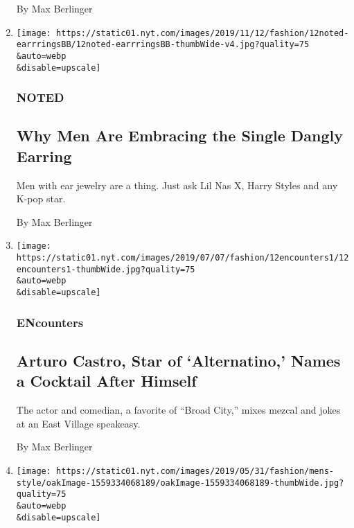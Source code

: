 \begin{enumerate}
  By Max Berlinger
\item
  \href{/2019/11/12/fashion/mens-single-dangly-earring.html}{}

  \texttt{[image: https://static01.nyt.com/images/2019/11/12/fashion/12noted-earrringsBB/12noted-earrringsBB-thumbWide-v4.jpg?quality=75\\\&auto=webp\\\&disable=upscale]}

  \hypertarget{noted}{%
  \subsubsection{NOTED}\label{noted}}

  \hypertarget{why-men-are-embracing-the-single-dangly-earring}{%
  \subsection{Why Men Are Embracing the Single Dangly
  Earring}\label{why-men-are-embracing-the-single-dangly-earring}}

  Men with ear jewelry are a thing. Just ask Lil Nas X, Harry Styles and
  any K-pop star.

  By Max Berlinger
\item
  \href{/2019/07/05/style/arturo-castro-alternatino-broad-city.html}{}

  \texttt{[image: https://static01.nyt.com/images/2019/07/07/fashion/12encounters1/12encounters1-thumbWide.jpg?quality=75\\\&auto=webp\\\&disable=upscale]}

  \hypertarget{encounters-1}{%
  \subsubsection{ENcounters}\label{encounters-1}}

  \hypertarget{arturo-castro-star-of-alternatino-names-a-cocktail-after-himself}{%
  \subsection{Arturo Castro, Star of `Alternatino,' Names a Cocktail
  After
  Himself}\label{arturo-castro-star-of-alternatino-names-a-cocktail-after-himself}}

  The actor and comedian, a favorite of ``Broad City,'' mixes mezcal and
  jokes at an East Village speakeasy.

  By Max Berlinger
\item
  \href{/2019/06/05/fashion/mens-style/new-mens-underwear-briefly.html}{}

  \texttt{[image: https://static01.nyt.com/images/2019/05/31/fashion/mens-style/oakImage-1559334068189/oakImage-1559334068189-thumbWide.jpg?quality=75\\\&auto=webp\\\&disable=upscale]}


\end{enumerate}
